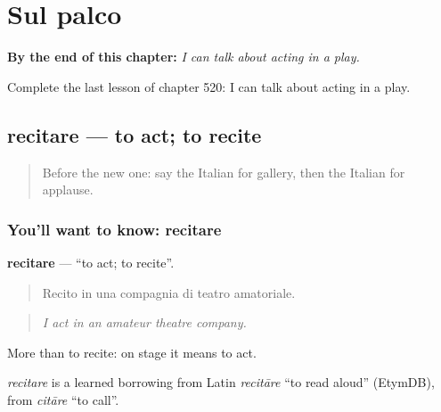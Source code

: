 
\chapter{Sul palco}
\label{ch:it-sul-palco}

\begin{chapteropening}
\textbf{By the end of this chapter:} \emph{I can talk about acting in a play.}

Complete the last lesson of chapter 520: I can talk about acting in a play.
\end{chapteropening}

\section[recitare]{recitare — to act; to recite}

\label{lesson:IT-C520-recitare}



\begin{quote}
Before the new one: say the Italian for gallery, then the Italian for applause.
\end{quote}

\subsection*{You'll want to know: recitare}
\textbf{recitare} — \textquotedblleft{}to act; to recite\textquotedblright{}.

\begin{quote}
Recito in una compagnia di teatro amatoriale.
\end{quote}

\begin{quote}
\emph{I act in an amateur theatre company.}
\end{quote}

More than to recite: on stage it means to act.

\begin{cousinweb}
\emph{recitare} is a learned borrowing from Latin \emph{recitāre} \textquotedblleft{}to read aloud\textquotedblright{} (EtymDB), from \emph{citāre} \textquotedblleft{}to call\textquotedblright{}.
\end{cousinweb}

